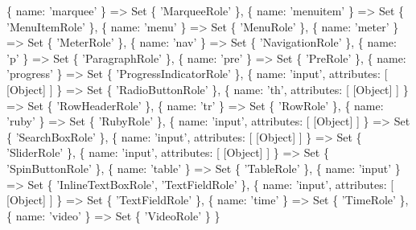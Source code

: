 \begin{DoxyCode}
  \{ name: 'marquee' \} => Set \{ 'MarqueeRole' \},
  \{ name: 'menuitem' \} => Set \{ 'MenuItemRole' \},
  \{ name: 'menu' \} => Set \{ 'MenuRole' \},
  \{ name: 'meter' \} => Set \{ 'MeterRole' \},
  \{ name: 'nav' \} => Set \{ 'NavigationRole' \},
  \{ name: 'p' \} => Set \{ 'ParagraphRole' \},
  \{ name: 'pre' \} => Set \{ 'PreRole' \},
  \{ name: 'progress' \} => Set \{ 'ProgressIndicatorRole' \},
  \{ name: 'input', attributes: [ [Object] ] \} => Set \{ 'RadioButtonRole' \},
  \{ name: 'th', attributes: [ [Object] ] \} => Set \{ 'RowHeaderRole' \},
  \{ name: 'tr' \} => Set \{ 'RowRole' \},
  \{ name: 'ruby' \} => Set \{ 'RubyRole' \},
  \{ name: 'input', attributes: [ [Object] ] \} => Set \{ 'SearchBoxRole' \},
  \{ name: 'input', attributes: [ [Object] ] \} => Set \{ 'SliderRole' \},
  \{ name: 'input', attributes: [ [Object] ] \} => Set \{ 'SpinButtonRole' \},
  \{ name: 'table' \} => Set \{ 'TableRole' \},
  \{ name: 'input' \} => Set \{ 'InlineTextBoxRole', 'TextFieldRole' \},
  \{ name: 'input', attributes: [ [Object] ] \} => Set \{ 'TextFieldRole' \},
  \{ name: 'time' \} => Set \{ 'TimeRole' \},
  \{ name: 'video' \} => Set \{ 'VideoRole' \}
\}
\end{DoxyCode}
 